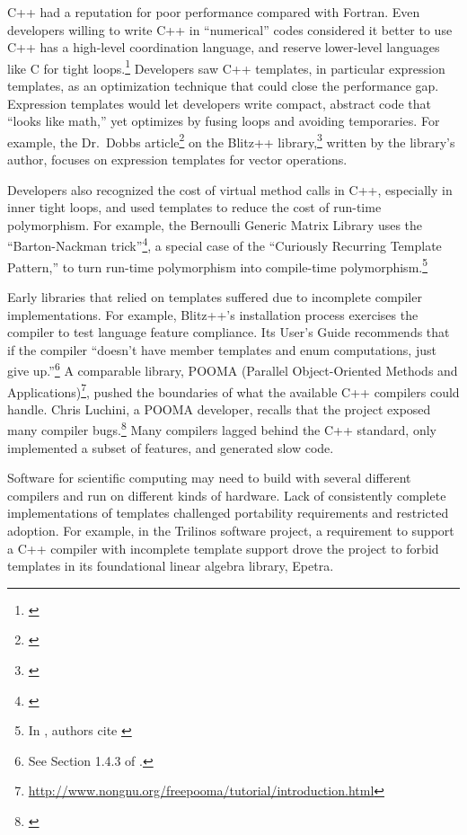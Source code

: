 C++ had a reputation for poor performance compared with Fortran. Even developers
willing to write C++ in ``numerical'' codes considered it better to use C++ has a
high-level coordination language, and reserve lower-level languages like C for
tight loops.\footnote{\cite{Arge1997}} Developers saw C++ templates, in particular
expression templates, as an optimization technique that could close the
performance gap. Expression templates would let developers write compact,
abstract code that ``looks like math,'' yet optimizes by fusing loops and avoiding
temporaries. For example, the Dr.\ Dobbs article\footnote{\cite{dobbsblitz1997}}
on the Blitz++ library,\footnote{\cite{blitz2005}} written by the
library's author, focuses on expression templates for vector operations.

Developers also recognized the cost of virtual method calls in C++,
especially in inner tight loops, and used templates to reduce the cost
of run-time polymorphism.  For example, the Bernoulli Generic Matrix
Library uses the ``Barton-Nackman trick''\footnote{\cite{Barton1994}}, a special
case of the ``Curiously Recurring Template Pattern,'' to turn run-time
polymorphism into compile-time polymorphism.\footnote{In
  \cite{Mateev2000}, authors cite \cite{Veldhuizen2000}}

Early libraries that relied on templates suffered due to incomplete compiler
implementations. For example, Blitz++'s installation process exercises the
compiler to test language feature compliance. Its User's Guide recommends that
if the compiler ``doesn't have member templates and enum computations, just give
up.''\footnote{See Section 1.4.3 of \cite{blitz2005}.} A comparable library,
POOMA (Parallel Object-Oriented Methods and
Applications)\footnote{\url{http://www.nongnu.org/freepooma/tutorial/introduction.html}},
pushed the boundaries of what the available C++
compilers could handle. Chris Luchini, a POOMA developer, recalls that the
project exposed many compiler bugs.\footnote{\cite{hoemmen2018history}}
Many compilers lagged behind the C++ standard,
only implemented a subset of features,
and generated slow code\cite{Mateev2000}.

Software for scientific computing may need to build with several different
compilers and run on different kinds of hardware. Lack of consistently complete
implementations of templates challenged portability requirements and restricted
adoption. For example, in the Trilinos software project, a requirement to
support a C++ compiler with incomplete template support drove the project to
forbid templates in its foundational linear algebra library, Epetra.\cite{hoemmen2018history}

